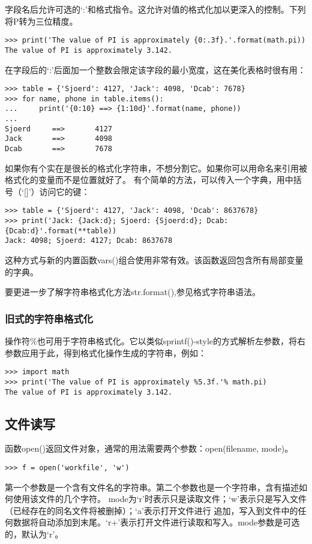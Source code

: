 \documentclass[UTF8]{ctexart}
\begin{document}
字段名后允许可选的`:'和格式指令。这允许对值的格式化加以更深入的控制。下列将P转为三位精度。
\begin{verbatim}
>>> print('The value of PI is approximately {0:.3f}.'.format(math.pi))
The value of PI is approximately 3.142.
\end{verbatim}

在字段后的`:'后面加一个整数会限定该字段的最小宽度，这在美化表格时很有用：
\begin{verbatim}
>>> table = {'Sjoerd': 4127, 'Jack': 4098, 'Dcab': 7678}
>>> for name, phone in table.items():
...     print('{0:10} ==> {1:10d}'.format(name, phone))
...
Sjoerd     ==>       4127
Jack       ==>       4098
Dcab       ==>       7678
\end{verbatim}

如果你有个实在是很长的格式化字符串，不想分割它。如果你可以用命名来引用被格式化的变量而不是位置就好了。
有个简单的方法，可以传入一个字典，用中括号（`[]'）访问它的键：
\begin{verbatim}
>>> table = {'Sjoerd': 4127, 'Jack': 4098, 'Dcab': 8637678}
>>> print('Jack: {Jack:d}; Sjoerd: {Sjoerd:d}; Dcab: {Dcab:d}'.format(**table))
Jack: 4098; Sjoerd: 4127; Dcab: 8637678
\end{verbatim}

这种方式与新的内置函数vars()组合使用非常有效。该函数返回包含所有局部变量的字典。

要更进一步了解字符串格式化方法str.format(),参见格式字符串语法。

\subsubsection{旧式的字符串格式化}
操作符\%也可用于字符串格式化。它以类似sprintf()-style的方式解析左参数，将右参数应用于此，得到格式化操作生成的字符串，例如：
\begin{verbatim}
>>> import math
>>> print('The value of PI is approximately %5.3f.'% math.pi)
The value of PI is approximately 3.142.
\end{verbatim}

\subsection{文件读写}
函数open()返回文件对象，通常的用法需要两个参数：open(filename, mode)。
\begin{verbatim}
>>> f = open('workfile', 'w')
\end{verbatim}

第一个参数是一个含有文件名的字符串。第二个参数也是一个字符串，含有描述如何使用该文件的几个字符。
mode为`r'时表示只是读取文件；`w'表示只是写入文件（已经存在的同名文件将被删掉）；`a'表示打开文件进行
追加，写入到文件中的任何数据将自动添加到末尾。`r+'表示打开文件进行读取和写入。mode参数是可选的，默认为`r'。
\end{document}
